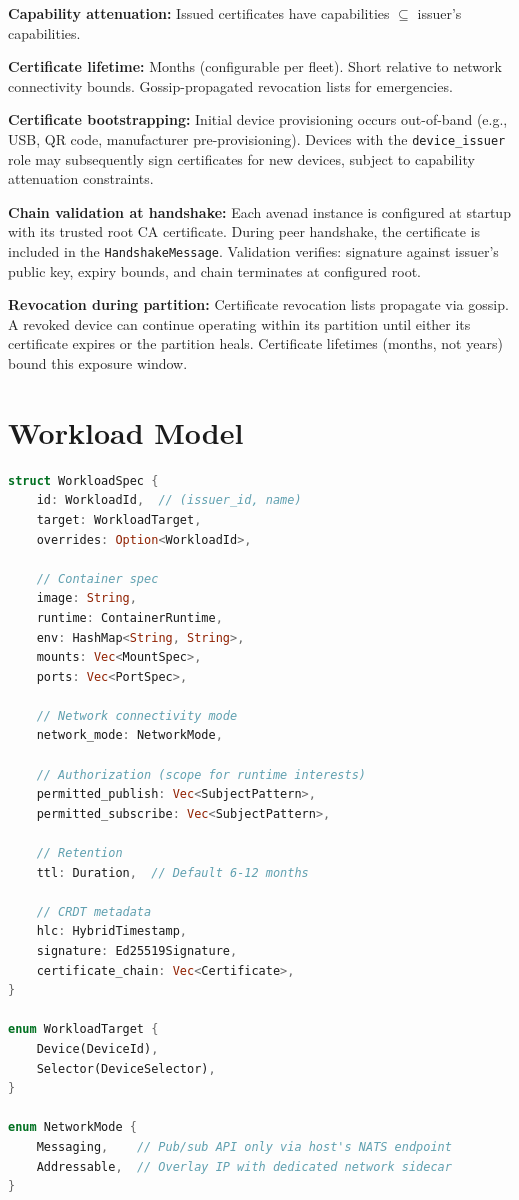 \textbf{Capability attenuation:} Issued certificates have capabilities $\subseteq$ issuer's capabilities.

\textbf{Certificate lifetime:} Months (configurable per fleet). Short relative to network connectivity bounds. Gossip-propagated revocation lists for emergencies.

\textbf{Certificate bootstrapping:} Initial device provisioning occurs out-of-band (e.g., USB, QR code, manufacturer pre-provisioning). Devices with the \texttt{device\_issuer} role may subsequently sign certificates for new devices, subject to capability attenuation constraints.

\textbf{Chain validation at handshake:} Each avenad instance is configured at startup with its trusted root CA certificate. During peer handshake, the certificate is included in the \texttt{HandshakeMessage}. Validation verifies: signature against issuer's public key, expiry bounds, and chain terminates at configured root.

\textbf{Revocation during partition:} Certificate revocation lists propagate via gossip. A revoked device can continue operating within its partition until either its certificate expires or the partition heals. Certificate lifetimes (months, not years) bound this exposure window.

\section{Workload Model}
\label{sec:workloads}

\begin{lstlisting}[language=Rust]
struct WorkloadSpec {
    id: WorkloadId,  // (issuer_id, name)
    target: WorkloadTarget,
    overrides: Option<WorkloadId>,

    // Container spec
    image: String,
    runtime: ContainerRuntime,
    env: HashMap<String, String>,
    mounts: Vec<MountSpec>,
    ports: Vec<PortSpec>,

    // Network connectivity mode
    network_mode: NetworkMode,

    // Authorization (scope for runtime interests)
    permitted_publish: Vec<SubjectPattern>,
    permitted_subscribe: Vec<SubjectPattern>,
    
    // Retention
    ttl: Duration,  // Default 6-12 months
    
    // CRDT metadata
    hlc: HybridTimestamp,
    signature: Ed25519Signature,
    certificate_chain: Vec<Certificate>,
}

enum WorkloadTarget {
    Device(DeviceId),
    Selector(DeviceSelector),
}

enum NetworkMode {
    Messaging,    // Pub/sub API only via host's NATS endpoint
    Addressable,  // Overlay IP with dedicated network sidecar
}
\end{lstlisting}

